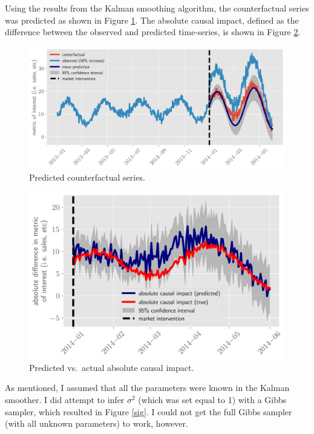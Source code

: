 \documentclass[12pt]{article}
\begin{document}
Using the results from the Kalman smoothing algorithm, the  counterfactual series was predicted as shown in Figure \ref{pred}. The absolute causal impact, defined as the difference between the observed and predicted time-series, is shown in Figure \ref{diff}.
\begin{figure}[!h]
    \centering
    \includegraphics[scale=.5
    ]{../figures/pred.png}
    \caption{Predicted counterfactual series.}
    \label{pred}
\end{figure}

\begin{figure}[!h]
    \centering
    \includegraphics[scale=.5
    ]{../figures/diff.png}
    \caption{Predicted vs.\ actual absolute causal impact.}
    \label{diff}
\end{figure}

As mentioned, I assumed that all the parameters were known in the Kalman smoother. I did attempt to infer $\sigma^2$ (which was set equal to 1) with a Gibbs sampler, which resulted in Figure \ref{sig}. I could not get the full Gibbs sampler (with all unknown parameters) to work, however.
\end{document}
